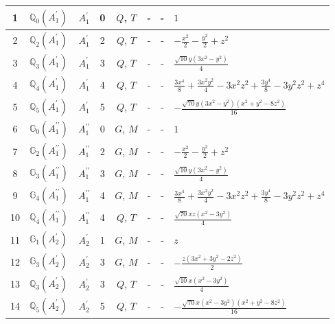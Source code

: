 \documentclass[fleqn,10pt,landscape]{jsarticle}
\begin{document}
\begin{longtable}[l]{clcccccl}
1 & $\mathbb{Q}_{0}(A_{1}^{\prime})$ & $A_{1}^{\prime}$ & 0 & $Q$, $T$ & - & - & $1$ \\ \hline
2 & $\mathbb{Q}_{2}(A_{1}^{\prime})$ & $A_{1}^{\prime}$ & 2 & $Q$, $T$ & - & - & $- \frac{x^{2}}{2} - \frac{y^{2}}{2} + z^{2}$ \\ \hline
3 & $\mathbb{Q}_{3}(A_{1}^{\prime})$ & $A_{1}^{\prime}$ & 3 & $Q$, $T$ & - & - & $\frac{\sqrt{10} y \left(3 x^{2} - y^{2}\right)}{4}$ \\ \hline
4 & $\mathbb{Q}_{4}(A_{1}^{\prime})$ & $A_{1}^{\prime}$ & 4 & $Q$, $T$ & - & - & $\frac{3 x^{4}}{8} + \frac{3 x^{2} y^{2}}{4} - 3 x^{2} z^{2} + \frac{3 y^{4}}{8} - 3 y^{2} z^{2} + z^{4}$ \\ \hline
5 & $\mathbb{Q}_{5}(A_{1}^{\prime})$ & $A_{1}^{\prime}$ & 5 & $Q$, $T$ & - & - & $- \frac{\sqrt{70} y \left(3 x^{2} - y^{2}\right) \left(x^{2} + y^{2} - 8 z^{2}\right)}{16}$ \\ \hline
6 & $\mathbb{G}_{0}(A_{1}^{\prime\prime})$ & $A_{1}^{\prime\prime}$ & 0 & $G$, $M$ & - & - & $1$ \\ \hline
7 & $\mathbb{G}_{2}(A_{1}^{\prime\prime})$ & $A_{1}^{\prime\prime}$ & 2 & $G$, $M$ & - & - & $- \frac{x^{2}}{2} - \frac{y^{2}}{2} + z^{2}$ \\ \hline
8 & $\mathbb{G}_{3}(A_{1}^{\prime\prime})$ & $A_{1}^{\prime\prime}$ & 3 & $G$, $M$ & - & - & $\frac{\sqrt{10} y \left(3 x^{2} - y^{2}\right)}{4}$ \\ \hline
9 & $\mathbb{G}_{4}(A_{1}^{\prime\prime})$ & $A_{1}^{\prime\prime}$ & 4 & $G$, $M$ & - & - & $\frac{3 x^{4}}{8} + \frac{3 x^{2} y^{2}}{4} - 3 x^{2} z^{2} + \frac{3 y^{4}}{8} - 3 y^{2} z^{2} + z^{4}$ \\ \hline
10 & $\mathbb{Q}_{4}(A_{1}^{\prime\prime})$ & $A_{1}^{\prime\prime}$ & 4 & $Q$, $T$ & - & - & $\frac{\sqrt{70} x z \left(x^{2} - 3 y^{2}\right)}{4}$ \\ \hline
11 & $\mathbb{G}_{1}(A_{2}^{\prime})$ & $A_{2}^{\prime}$ & 1 & $G$, $M$ & - & - & $z$ \\ \hline
12 & $\mathbb{G}_{3}(A_{2}^{\prime})$ & $A_{2}^{\prime}$ & 3 & $G$, $M$ & - & - & $- \frac{z \left(3 x^{2} + 3 y^{2} - 2 z^{2}\right)}{2}$ \\ \hline
13 & $\mathbb{Q}_{3}(A_{2}^{\prime})$ & $A_{2}^{\prime}$ & 3 & $Q$, $T$ & - & - & $\frac{\sqrt{10} x \left(x^{2} - 3 y^{2}\right)}{4}$ \\ \hline
14 & $\mathbb{Q}_{5}(A_{2}^{\prime})$ & $A_{2}^{\prime}$ & 5 & $Q$, $T$ & - & - & $- \frac{\sqrt{70} x \left(x^{2} - 3 y^{2}\right) \left(x^{2} + y^{2} - 8 z^{2}\right)}{16}$ \\ \hline

\end{longtable}
\end{document}
